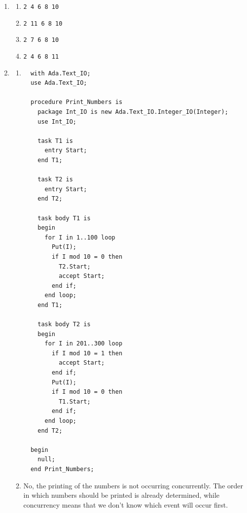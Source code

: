\documentclass[a4paper,11pt]{article} %
\newcommand{\code}[1]{\texttt{#1}}
\begin{document}
\begin{enumerate}
  \item %
  \begin{enumerate}
    \item \code{2 4 6 8 10}
    \item \code{2 11 6 8 10}
    \item \code{2 7 6 8 10}
    \item \code{2 4 6 8 11}
  \end{enumerate}

  \item %
  \begin{enumerate}
    \item %
\begin{lstlisting}
  with Ada.Text_IO;
  use Ada.Text_IO;

  procedure Print_Numbers is
    package Int_IO is new Ada.Text_IO.Integer_IO(Integer);
    use Int_IO;

    task T1 is
      entry Start;
    end T1;

    task T2 is
      entry Start;
    end T2;

    task body T1 is
    begin
      for I in 1..100 loop
        Put(I);
        if I mod 10 = 0 then
          T2.Start;
          accept Start;
        end if;
      end loop;
    end T1;

    task body T2 is
    begin
      for I in 201..300 loop
        if I mod 10 = 1 then
          accept Start;
        end if;
        Put(I);
        if I mod 10 = 0 then
          T1.Start;
        end if;
      end loop;
    end T2;

  begin
    null;
  end Print_Numbers;
\end{lstlisting}
    \item %
    No, the printing of the numbers is not occurring concurrently.
    The order in which numbers should be printed is already determined,
    while concurrency means that we don't know which event will occur first.

  \end{enumerate}

\end{enumerate}
\end{document}
